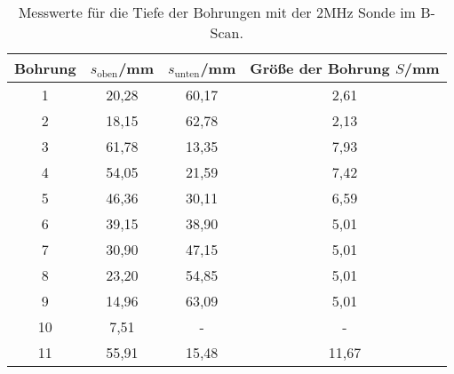 \begin{table}[H]
  \centering
  \caption{Messwerte für die Tiefe der Bohrungen mit der 2\;MHz Sonde im B-Scan.}
  \label{tab:tab3}
    \begin{tabular}{c c c c}
    \toprule
    Bohrung & $s_{\text{oben}}$/\;mm & $s_{\text{unten}}$/\;mm & Größe der Bohrung $S$/\;mm\\
    \midrule
    1& 20,28 & 60,17 & 2,61\\
    2& 18,15 & 62,78 & 2,13\\
    3& 61,78 & 13,35 & 7,93\\
    4 & 54,05 & 21,59 & 7,42\\
    5& 46,36 & 30,11 & 6,59\\
    6& 39,15 & 38,90 & 5,01\\
    7& 30,90 & 47,15 & 5,01\\
    8& 23,20 & 54,85 & 5,01\\
    9& 14,96 & 63,09 & 5,01\\
    10 & 7,51 & - & -\\
    11 & 55,91 & 15,48 & 11,67\\
    \bottomrule
    \end{tabular}
  \end{table}
